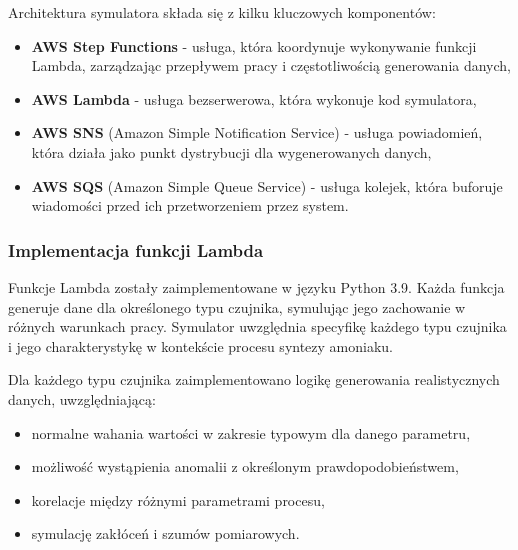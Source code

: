 Architektura symulatora składa się z kilku kluczowych komponentów:

\begin{itemize}
    \item \textbf{AWS Step Functions} - usługa, która koordynuje wykonywanie funkcji Lambda, zarządzając przepływem pracy i częstotliwością generowania danych,
    \item \textbf{AWS Lambda} \cite{aws_lambda_docs} - usługa bezserwerowa, która wykonuje kod symulatora,
    \item \textbf{AWS SNS} (Amazon Simple Notification Service) \cite{sns_docs} - usługa powiadomień, która działa jako punkt dystrybucji dla wygenerowanych danych,
    \item \textbf{AWS SQS} (Amazon Simple Queue Service) \cite{sqs_docs} - usługa kolejek, która buforuje wiadomości przed ich przetworzeniem przez system.
\end{itemize}

%

\subsubsection{Implementacja funkcji Lambda}
\label{subsubsec:implementacja_lambda}

Funkcje Lambda zostały zaimplementowane w języku Python 3.9. Każda funkcja generuje dane dla określonego typu czujnika,
symulując jego zachowanie w różnych warunkach pracy. Symulator uwzględnia specyfikę każdego typu czujnika i jego charakterystykę w kontekście procesu syntezy amoniaku.

Dla każdego typu czujnika zaimplementowano logikę generowania realistycznych danych, uwzględniającą:
\begin{itemize}
    \item normalne wahania wartości w zakresie typowym dla danego parametru,
    \item możliwość wystąpienia anomalii z określonym prawdopodobieństwem,
    \item korelacje między różnymi parametrami procesu,
    \item symulację zakłóceń i szumów pomiarowych.
\end{itemize}